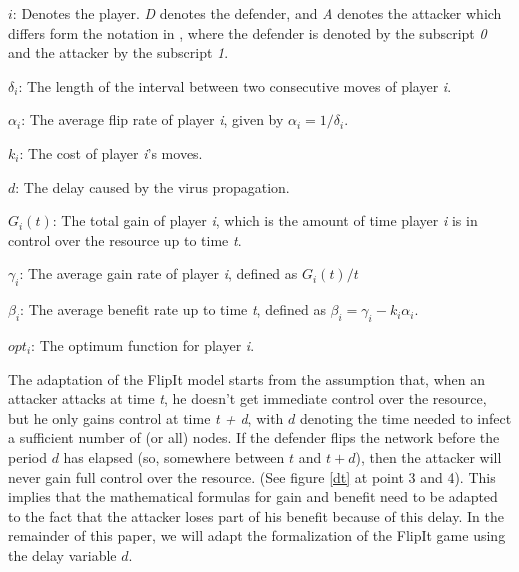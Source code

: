 \begin{description}
\item $i$: Denotes the player. \textit{D} denotes the defender, and \textit{A} denotes the attacker which differs form the notation in \citep{FlipIt}, where the defender is denoted by the subscript \textit{0} and the attacker by the subscript \textit{1}.
\item $\delta_{i}$: The length of the interval between two consecutive moves of player \textit{i}. 
\item $\alpha_{i}$: The average flip rate of player \textit{i}, given by $\alpha_{i}=1/\delta_{i}$.
\item $k_{i}$: The cost of player \textit{i}'s moves.
\item $d$: The delay caused by the virus propagation.
\item $G_{i}(t)$: The total gain of player \textit{i}, which is the amount of time player \textit{i} is in control over the resource up to time \textit{t}.
\item $\gamma_{i}$: The average gain rate of player \textit{i}, defined as $G_{i}(t)/t$
\item $\beta_{i}$:  The average benefit rate up to time \textit{t}, defined as  $\beta_{i} = \gamma_{i} -k_{i} \alpha_{i} $.
\item $opt_{i}$: The optimum function for player \textit{i}. 
\end{description}

The adaptation of the FlipIt model starts from the assumption that, when an attacker attacks at time \textit{t}, he doesn't get immediate control over the resource, but he only gains control at time \textit{t + d}, with $d$ denoting the time needed to infect a sufficient number of (or all) nodes. If the defender flips the network before the period $d$ has elapsed (so, somewhere between $t$ and $t + d$), then the attacker will never gain full control over the resource. (See figure \ref{dt} at point 3 and 4). This implies that the mathematical formulas for gain and benefit need to be adapted to the fact that the attacker loses part of his benefit because of this delay. In the remainder of this paper, we will adapt the formalization of the FlipIt game using the delay variable $d$. \\ 

